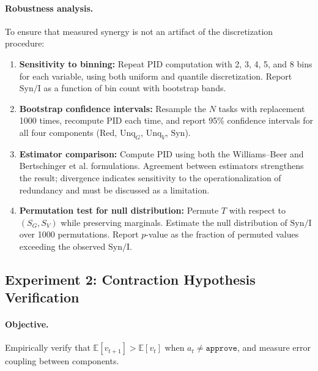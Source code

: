 \documentclass[11pt,a4paper]{article}
\theoremstyle{remark}
\newcommand{\E}{\mathbb{E}}
\newcommand{\Syn}{\mathrm{Syn}}
\newcommand{\Red}{\mathrm{Red}}
\newcommand{\Unq}{\mathrm{Unq}}
\newcommand{\MI}{\mathrm{I}}
\begin{document}
\paragraph{Robustness analysis.} To ensure that measured synergy is not an artifact of the discretization procedure:
\begin{enumerate}
  \item \textbf{Sensitivity to binning:} Repeat PID computation with 2, 3, 4, 5, and 8 bins for each variable, using both uniform and quantile discretization. Report $\Syn / \MI$ as a function of bin count with bootstrap bands.
  \item \textbf{Bootstrap confidence intervals:} Resample the $N$ tasks with replacement 1000 times, recompute PID each time, and report 95\% confidence intervals for all four components ($\Red$, $\Unq_G$, $\Unq_V$, $\Syn$).
  \item \textbf{Estimator comparison:} Compute PID using both the Williams--Beer \cite{williams2010pid} and Bertschinger et al. \cite{bertschinger2014pid} formulations. Agreement between estimators strengthens the result; divergence indicates sensitivity to the operationalization of redundancy and must be discussed as a limitation.
  \item \textbf{Permutation test for null distribution:} Permute $T$ with respect to $(S_G, S_V)$ while preserving marginals. Estimate the null distribution of $\Syn / \MI$ over 1000 permutations. Report $p$-value as the fraction of permuted values exceeding the observed $\Syn / \MI$.
\end{enumerate}

\subsection{Experiment 2: Contraction Hypothesis Verification}

\paragraph{Objective.} Empirically verify that $\E[v_{t+1}] > \E[v_t]$ when $a_t \neq \texttt{approve}$, and measure error coupling between components.
\end{document}
